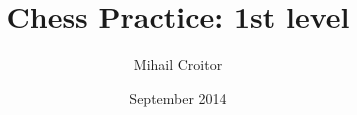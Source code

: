 \documentclass[a6paper]{book}
\title{Chess Practice: 1st level}
\author{Mihail Croitor}
\date{September 2014}
\begin{document}
\maketitle


\pagebreak


\smallbreak

\smallbreak

\smallbreak

\smallbreak

\smallbreak

\smallbreak

\smallbreak

\smallbreak


\pagebreak


\smallbreak

\smallbreak

\smallbreak

\smallbreak

\smallbreak


\pagebreak


\smallbreak

\smallbreak

\smallbreak

\smallbreak

\smallbreak

\smallbreak


\pagebreak


\smallbreak

\smallbreak

\smallbreak


\pagebreak
{}
\fancyhead[RE,LO]{--}

\renewcommand{\labelenumi}{\bf{D.\arabic{enumi}}}
\begin{multicols}{2}



















\end{multicols}
\smallbreak
\begin{multicols}{2}




\end{multicols}
\end{document}
